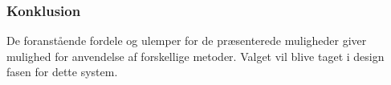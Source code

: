 \subsubsection{Konklusion}

De foranstående fordele og ulemper for de præsenterede muligheder giver mulighed for anvendelse af forskellige metoder. Valget vil blive taget i design fasen for dette system.\\



\newpage
